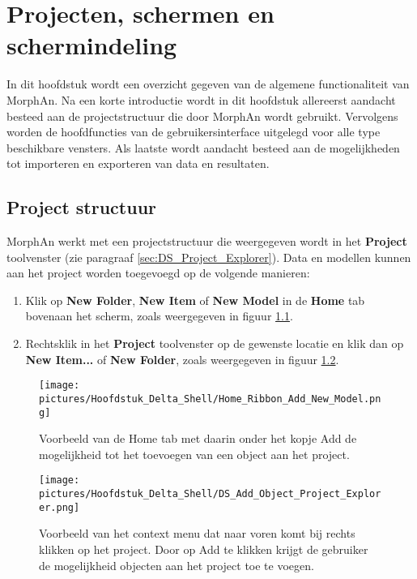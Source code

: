
\chapter{Projecten, schermen en schermindeling}
	\label{ch:DeltaShell}

In dit hoofdstuk wordt een overzicht gegeven van de algemene functionaliteit van MorphAn. Na een korte introductie wordt in dit hoofdstuk allereerst aandacht besteed aan de projectstructuur die door MorphAn wordt gebruikt. Vervolgens worden de hoofdfuncties van de gebruikersinterface uitgelegd voor alle type beschikbare vensters. Als laatste wordt aandacht besteed aan de mogelijkheden tot importeren en exporteren van data en resultaten.

\section{Project structuur}
	\label{sec:DS_Project_Structure}
MorphAn werkt met een projectstructuur die weergegeven wordt in het \textbf{Project} toolvenster (zie paragraaf \ref{sec:DS_Project_Explorer}). Data en modellen kunnen aan het project worden toegevoegd op de volgende manieren:

\begin{enumerate}
	\item Klik op \textbf{New Folder}, \textbf{New Item} of \textbf{New Model} in de \textbf{Home} tab bovenaan het scherm, zoals weergegeven in figuur \ref{fig:DS_Add_Object}.
	\item Rechtsklik in het \textbf{Project} toolvenster op de gewenste locatie en klik dan op \textbf{New Item...} of \textbf{New Folder}, zoals weergegeven in figuur \ref{fig:DS_Add_Object_Project_Explorer}.
\end{enumerate}

\begin{figure}[H]
	\centering
		\texttt{[image: pictures/Hoofdstuk\_Delta\_Shell/Home\_Ribbon\_Add\_New\_Model.png]}
		\caption{Voorbeeld van de Home tab met daarin onder het kopje Add de mogelijkheid tot het toevoegen van een object aan het project.}
	\label{fig:DS_Add_Object}
\end{figure}
\begin{figure}[H]
	\centering
		\texttt{[image: pictures/Hoofdstuk\_Delta\_Shell/DS\_Add\_Object\_Project\_Explorer.png]}
		\caption{Voorbeeld van het context menu dat naar voren komt bij rechts klikken op het project. Door op Add te klikken krijgt de gebruiker de mogelijkheid objecten aan het project toe te voegen.}
	\label{fig:DS_Add_Object_Project_Explorer}
\end{figure}

